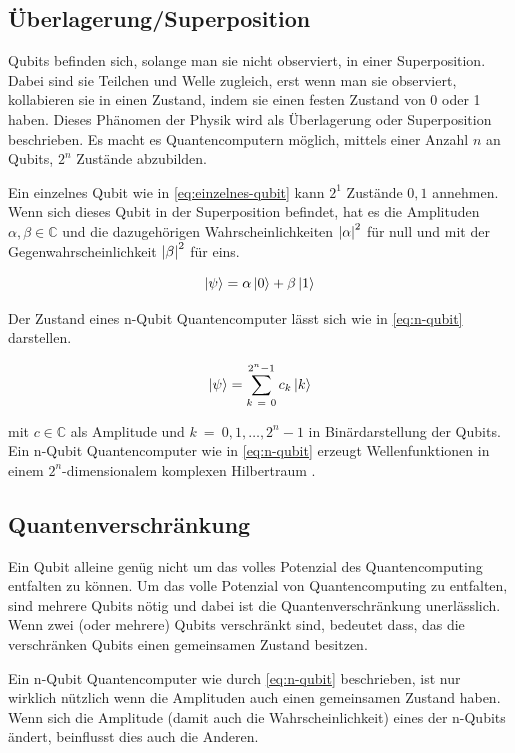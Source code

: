 \subsection{Überlagerung/Superposition}
Qubits befinden sich, solange man sie nicht observiert, in einer Superposition.
Dabei sind sie Teilchen und Welle zugleich, erst wenn man sie observiert, kollabieren sie in einen Zustand, indem sie einen festen Zustand von 0 oder 1 haben.
Dieses Phänomen der Physik wird als Überlagerung oder Superposition beschrieben.
Es macht es Quantencomputern möglich, mittels einer Anzahl $n$ an Qubits, $2^n$ Zustände abzubilden.

Ein einzelnes Qubit wie in \ref{eq:einzelnes-qubit} kann $2^1$ Zustände ${0, 1}$ annehmen.
Wenn sich dieses Qubit in der Superposition befindet, hat es die Amplituden $\alpha, \beta \in \mathbb{C}$ und die dazugehörigen Wahrscheinlichkeiten ${\left|\alpha\right|}^2$ für null und mit der Gegenwahrscheinlichkeit ${\left|\beta\right|}^2$ für eins.

\begin{equation}
    \ket{\psi} = \alpha\ket{0} + \beta\ket{1}
    \label{eq:einzelnes-qubit}
\end{equation}

Der Zustand eines n-Qubit Quantencomputer lässt sich wie in \ref{eq:n-qubit} darstellen.

\begin{equation}
    \ket{\psi} = \sum_{k\ =\ 0}^{2^n-1}c_k\ket{k}
    \label{eq:n-qubit}
\end{equation}

mit $c\in\mathbb{C}$ als Amplitude und $k\ =\ 0,1,\dots,2^n-1$ in Binärdarstellung der Qubits.
Ein n-Qubit Quantencomputer wie in \ref{eq:n-qubit} erzeugt Wellenfunktionen in einem $2^n$-dimensionalem komplexen Hilbertraum \cite{QuantumComputationComplex}.

\subsection{Quantenverschränkung}
Ein Qubit alleine genüg nicht um das volles Potenzial des Quantencomputing entfalten zu können.
Um das volle Potenzial von Quantencomputing zu entfalten, sind mehrere Qubits nötig und dabei ist die Quantenverschränkung unerlässlich.
Wenn zwei (oder mehrere) Qubits verschränkt sind, bedeutet dass, das die verschränken Qubits einen gemeinsamen Zustand besitzen.

Ein n-Qubit Quantencomputer wie durch \ref{eq:n-qubit} beschrieben, ist nur wirklich nützlich wenn die Amplituden auch einen gemeinsamen Zustand haben.
Wenn sich die Amplitude (damit auch die Wahrscheinlichkeit) eines der n-Qubits ändert, beinflusst dies auch die Anderen.

